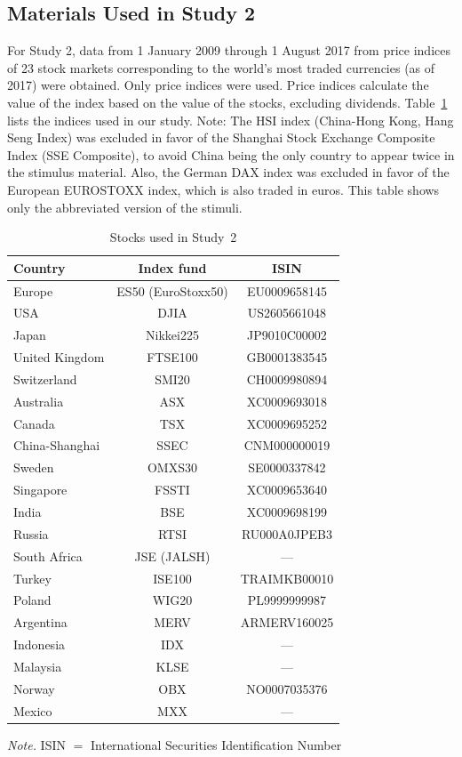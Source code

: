 \subsection{Materials Used in Study 2}
\label{tab:study2_material}
For Study 2, data from 1 January 2009 through 1 August 2017 from price indices of 23 stock markets corresponding to the world's most traded currencies (as of 2017) were obtained. Only price indices were used. Price indices calculate the value of the index based on the value of the stocks, excluding dividends. Table~\ref{tab:study2_material} lists the indices used in our study. Note: The HSI index (China-Hong Kong, Hang Seng Index) was excluded in favor of the Shanghai Stock Exchange Composite Index (SSE Composite), to avoid China being the only country to appear twice in the stimulus material. Also, the German DAX index was excluded in favor of the European EUROSTOXX index, which is also traded in euros. This table shows only the abbreviated version of the stimuli.
\begin{table}[ht]
\centering\small
\caption{Stocks used in Study~2} 
\label{tab:study2_material}
\begin{tabularx}{.6\textwidth}{lcc}
  \toprule
Country & Index fund & ISIN \\ 
  \midrule
Europe & ES50 (EuroStoxx50) & EU0009658145 \\ 
  USA & DJIA & US2605661048 \\ 
  Japan & Nikkei225 & JP9010C00002 \\ 
  United Kingdom & FTSE100 & GB0001383545 \\ 
  Switzerland & SMI20 & CH0009980894 \\ 
  Australia & ASX & XC0009693018 \\ 
  Canada & TSX & XC0009695252 \\ 
  China-Shanghai & SSEC & CNM000000019 \\ 
  Sweden & OMXS30 & SE0000337842 \\ 
  Singapore & FSSTI & XC0009653640 \\ 
  India & BSE & XC0009698199 \\ 
  Russia & RTSI & RU000A0JPEB3 \\ 
  South Africa & JSE (JALSH) & --- \\ 
  Turkey & ISE100 & TRAIMKB00010 \\ 
  Poland & WIG20 & PL9999999987 \\ 
  Argentina & MERV & ARMERV160025 \\ 
  Indonesia & IDX & --- \\ 
  Malaysia & KLSE & --- \\ 
  Norway & OBX & NO0007035376 \\ 
  Mexico & MXX & --- \\ 
   \bottomrule
\end{tabularx}
\begin{tablenotes}
    \textit{Note.} ISIN $=$ International Securities Identification Number
\end{tablenotes}
\end{table}



